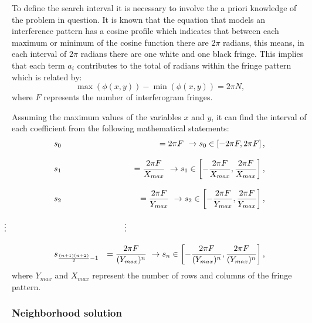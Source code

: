 \documentclass[review]{elsarticle}
\begin{document}
To define the search interval it is necessary to involve the a priori knowledge of the problem in question. It is known that the equation that models an interference pattern has a cosine profile which indicates that between each maximum or minimum of the cosine function there are $2\pi$ radians, this means, in each interval of $2\pi$ radians there are one white and one black fringe. This implies that each term $a_i$ contributes to the total of radians within the fringe pattern which is related by:
\begin{equation}\label{eq4}
\max(\phi(x,y)) - \min(\phi(x,y)) = 2\pi N \text{,}
\end{equation}
where $F$ represents the number of interferogram fringes.

Assuming the maximum values of the variables $x$ and $y$, it can find the interval of each coefficient from the following mathematical statements:
{
	\begin{eqnarray}\label{eq4.2}
	&s_0& = 2\pi F \ \to s_0\in\left[-2\pi F, 2\pi F\right] \text{,}\nonumber \\[0.3cm] \nonumber
	&s_1& = \frac{2\pi F}{X_{max}} \ \to s_1\in\left[-\frac{2\pi F}{X_{max}}, \frac{2\pi F}{X_{max}}\right] \text{,}\\[0.3cm]\nonumber
	&s_2& = \frac{2\pi F}{Y_{max}} \ \to s_2\in\left[-\frac{2\pi F}{Y_{max}}, \frac{2\pi F}{Y_{max}}\right]  \text{,}\\[0.3cm]\nonumber
	&\hspace{6cm} \vdotswithin{\mspace{-300mu}} \qquad \vdotswithin{\mspace{-300mu}} \nonumber\\[0.3cm]
	&s_{\frac{(n+1)(n+2)}{2}-1}& = \frac{2\pi F}{(Y_{max})^n} \ \to s_n\in\left[-\frac{2\pi F}{(Y_{max})^n}, \frac{2\pi F}{(Y_{max})^n}\right]\text{,}
	\end{eqnarray}
}
where $Y_{max}$ and $X_{max}$ represent the number of rows and columns of the fringe pattern.

\subsubsection{Neighborhood solution}
\end{document}
